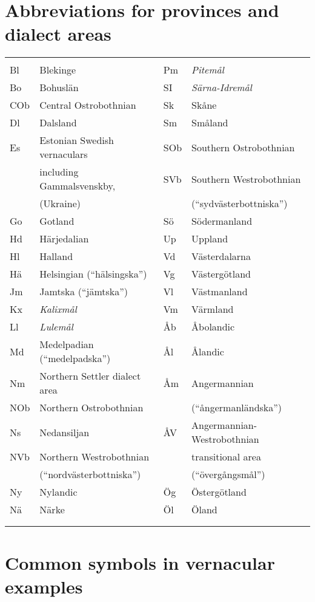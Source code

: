 \chapter[Abbreviations for provinces and dialect areas]{\rmfamily\bfseries Abbreviations for provinces and dialect areas}

\begin{tabular}{llll}
\lsptoprule
\multicolumn{4}{l}{Be

}\\
Bl & Blekinge & Pm & {\itshape Pitemål}\\
Bo & Bohuslän & SI & {\itshape Särna-Idremål}\\
COb & Central Ostrobothnian & Sk & Skåne\\
Dl & Dalsland & Sm & Småland\\
Es & Estonian Swedish vernaculars & SOb & Southern Ostrobothnian\\
& including Gammalsvenskby, & SVb & Southern Westrobothnian\\
& (Ukraine) &  & (“sydvästerbottniska”)\\
Go & Gotland & Sö & Södermanland\\
Hd & Härjedalian & Up & Uppland\\
Hl & Halland & Vd & Västerdalarna\\
Hä & Helsingian (“hälsingska”) & Vg & Västergötland\\
Jm & Jamtska (“jämtska”) & Vl & Västmanland\\
Kx & {\itshape Kalixmål} & Vm & Värmland\\
Ll & {\itshape Lulemål} & Åb & Åbolandic\\
Md & Medelpadian (“medelpadska”) & Ål & Ålandic\\
Nm & Northern Settler dialect area & Åm & Angermannian\\
NOb & Northern Ostrobothnian &  & (“ångermanländska”)\\
Ns & Nedansiljan & ÅV & Angermannian-Westrobothnian\\
NVb & Northern Westrobothnian &  & transitional area\\
& (“nordvästerbottniska”) &  & (“övergångsmål”)\\
Ny & Nylandic & Ög & Östergötland\\
Nä & Närke & Öl & Öland\\
&  &  & \\
\lspbottomrule
\end{tabular}

\chapter[Common symbols in vernacular examples]{\rmfamily\bfseries Common symbols in vernacular examples}
\label{bkm:Ref224104485}

